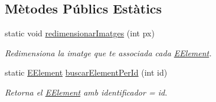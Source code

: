 \subsection*{Mètodes Públics Estàtics}
\begin{DoxyCompactItemize}
\item 
static void \hyperlink{enumlogica_1_1enumeracions_1_1_e_element_a463fe7d8bef930e62019d223bc2f0ed6}{redimensionar\+Imatges} (int px)
\begin{DoxyCompactList}\small\item\em Redimensiona la imatge que te associada cada \hyperlink{enumlogica_1_1enumeracions_1_1_e_element}{E\+Element}. \end{DoxyCompactList}\item 
static \hyperlink{enumlogica_1_1enumeracions_1_1_e_element}{E\+Element} \hyperlink{enumlogica_1_1enumeracions_1_1_e_element_a5bd957c7a226b8127a5ef222f7d5a869}{buscar\+Element\+Per\+Id} (int id)
\begin{DoxyCompactList}\small\item\em Retorna el \hyperlink{enumlogica_1_1enumeracions_1_1_e_element}{E\+Element} amb identificador = id. \end{DoxyCompactList}\end{DoxyCompactItemize}

